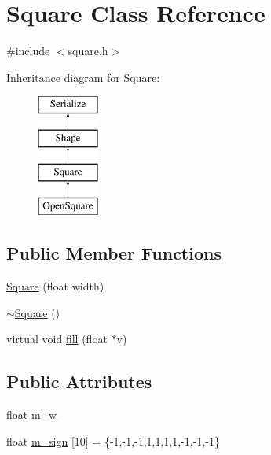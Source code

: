 \hypertarget{classSquare}{\section{Square Class Reference}
\label{classSquare}
}


{\ttfamily \#include $<$square.\-h$>$}

Inheritance diagram for Square\-:\begin{figure}[H]
\begin{center}
\leavevmode
\includegraphics[height=4.000000cm]{classSquare}
\end{center}
\end{figure}
\subsection*{Public Member Functions}
\begin{DoxyCompactItemize}
\item 
\hyperlink{classSquare_ae08fc41594d222353ce211889f1b9116}{Square} (float width)
\item 
\hyperlink{classSquare_a90af7ce1060cff7b717ceddb333846b8}{$\sim$\-Square} ()
\item 
virtual void \hyperlink{classSquare_aedaf26740b0f71c086886d5519cf44a6}{fill} (float $\ast$v)
\end{DoxyCompactItemize}
\subsection*{Public Attributes}
\begin{DoxyCompactItemize}
\item 
float \hyperlink{classSquare_ab590a983d9ff84dd6d337e40697ae0d6}{m\-\_\-w}
\item 
float \hyperlink{classSquare_ad4f52dd3d5d29f77db924c3ce447de47}{m\-\_\-sign} \mbox{[}10\mbox{]} = \{-\/1,-\/1,-\/1,1,1,1,1,-\/1,-\/1,-\/1\}
\end{DoxyCompactItemize}


